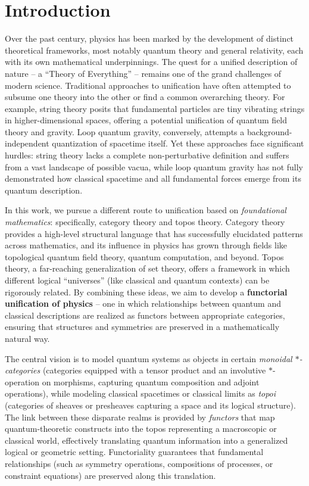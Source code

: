 \section{Introduction}

Over the past century, physics has been marked by the development of distinct theoretical frameworks, most notably quantum theory and general relativity, each with its own mathematical underpinnings. The quest for a unified description of nature -- a ``Theory of Everything'' -- remains one of the grand challenges of modern science. Traditional approaches to unification have often attempted to subsume one theory into the other or find a common overarching theory. For example, string theory posits that fundamental particles are tiny vibrating strings in higher-dimensional spaces, offering a potential unification of quantum field theory and gravity. Loop quantum gravity, conversely, attempts a background-independent quantization of spacetime itself. Yet these approaches face significant hurdles: string theory lacks a complete non-perturbative definition and suffers from a vast landscape of possible vacua, while loop quantum gravity has not fully demonstrated how classical spacetime and all fundamental forces emerge from its quantum description.

\vspace{0.5cm}

In this work, we pursue a different route to unification based on \emph{foundational mathematics}: specifically, category theory and topos theory. Category theory provides a high-level structural language that has successfully elucidated patterns across mathematics, and its influence in physics has grown through fields like topological quantum field theory, quantum computation, and beyond. Topos theory, a far-reaching generalization of set theory, offers a framework in which different logical ``universes'' (like classical and quantum contexts) can be rigorously related. By combining these ideas, we aim to develop a \textbf{functorial unification of physics} -- one in which relationships between quantum and classical descriptions are realized as functors between appropriate categories, ensuring that structures and symmetries are preserved in a mathematically natural way.

\vspace{0.5cm}

The central vision is to model quantum systems as objects in certain \emph{monoidal $\ast$-categories} (categories equipped with a tensor product and an involutive $\ast$-operation on morphisms, capturing quantum composition and adjoint operations), while modeling classical spacetimes or classical limits as \emph{topoi} (categories of sheaves or presheaves capturing a space and its logical structure). The link between these disparate realms is provided by \emph{functors} that map quantum-theoretic constructs into the topos representing a macroscopic or classical world, effectively translating quantum information into a generalized logical or geometric setting. Functoriality guarantees that fundamental relationships (such as symmetry operations, compositions of processes, or constraint equations) are preserved along this translation.

